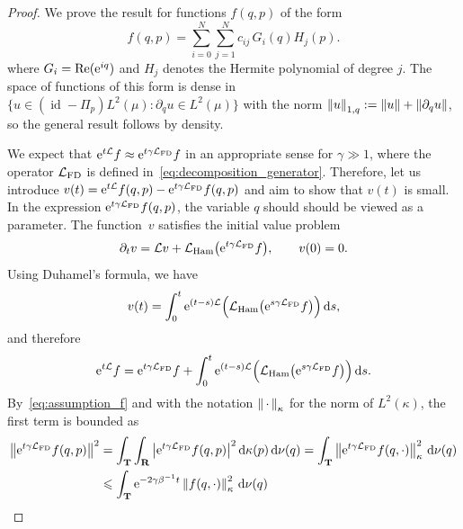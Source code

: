 \documentclass[11pt,a4paper]{article}
\DeclareMathOperator{\id}{id}
\newcommand{\e}{\mathrm{e}}
\newcommand{\dummy}{\,\cdot\,}
\newcommand{\real}{\mathbf R}
\newcommand{\torus}{\mathbf T}
\renewcommand{\d}{\mathrm d}
\theoremstyle{plain}
\numberwithin{equation}{section}
\renewcommand{\leq}{\leqslant}
\begin{document}
\begin{proof}
    We prove the result for functions $f(q, p)$ of the form
    \begin{equation}
        \label{eq:expansion}
        f(q, p) = \sum_{i=0}^{N} \sum_{j=1}^{N} c_{ij} \, G_i(q) H_j(p).
    \end{equation}
    where $G_i = {\rm Re}(\e^{iq})$ and $H_j$ denotes the Hermite polynomial of degree $j$.
    The space of functions of this form is dense in $\bigl\{u \in (\id - \Pi_p) L^2(\mu): \partial_q u \in L^2(\mu) \bigr\}$
    with the norm $\norm{u}_{1,q} := \norm{u} + \norm{\partial_q u}$,
    so the general result follows by density.

    We expect that $\e^{t \mathcal L} f \approx \e^{t \gamma \mathcal L_{\rm FD}} f$ in an appropriate sense for $\gamma \gg 1$,
    where the operator $\mathcal L_{\rm FD}$ is defined in~\eqref{eq:decomposition_generator}.
    Therefore, let us introduce $v(t) = \e^{t \mathcal L} f(q, p) - \e^{t \gamma \mathcal L_{\rm FD}} f(q, p)$
    and aim to show that $v(t)$ is small.
    In the expression $\e^{t \gamma \mathcal L_{\rm FD}} f(q, p)$,
    the variable $q$ should should be viewed as a parameter.
    The function~$v$ satisfies the initial value problem
    \[
        \partial_t v = \mathcal L v +  \mathcal L_{\rm Ham} \bigl(\e^{t \gamma \mathcal L_{\rm FD}} f\bigr), \qquad v(0) = 0.
    \]
    Using Duhamel's formula, we have
    \[
        v(t) = \int_{0}^{t} \e^{(t-s) \mathcal L}  \Bigl( \mathcal L_{\rm Ham} \bigl(\e^{s \gamma \mathcal L_{\rm FD}} f\bigr) \Bigr) \, \d s,
    \]
    and therefore
    \begin{equation}
        \label{eq:intermediate_decay_correlation}
        \e^{t \mathcal L} f =  \e^{t \gamma \mathcal L_{\rm FD}} f
        + \int_{0}^{t} \e^{(t-s) \mathcal L}  \Bigl( \mathcal L_{\rm Ham} \bigl(\e^{s \gamma \mathcal L_{\rm FD}} f\bigr) \Bigr) \, \d s.
    \end{equation}
    By~\eqref{eq:assumption_f} and with the notation $\norm{\dummy}[\kappa]$ for the norm of $L^2(\kappa)$,
    the first term is bounded as
    \begin{align}
        \notag
        \norm{\e^{t \gamma \mathcal L_{\rm FD}} f(q, p)}^2
        &= \int_{\torus} \int_{\real}  \abs{\e^{t \gamma \mathcal L_{\rm FD}} f(q, p) }^2 \d \kappa(p) \,\d \nu(q)
        = \int_{\torus} \norm{\e^{t \gamma \mathcal L_{\rm FD}} f(q, \cdot) }[\kappa]^2 \, \d \nu(q) \\
        \label{eq:bound_first_term}
        &\leq \int_{\torus} \e^{-2 \gamma \beta^{-1} t} \norm{f(q, \cdot) }[\kappa]^2 \, \d \nu(q)

\end{align}
\end{proof}
\end{document}
